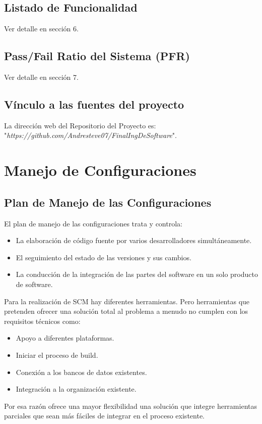 \documentclass[10pt]{article} %
\begin{document}
\subsection{Listado de Funcionalidad}
Ver detalle en sección 6. %

\subsection{Pass/Fail Ratio del Sistema (PFR)}
Ver detalle en sección 7.%

\subsection{Vínculo a las fuentes del proyecto}
La dirección web del Repositorio del Proyecto es: "\textit{https://github.com/Andresteve07/FinalIngDeSoftware}".

\section{Manejo de Configuraciones}

\subsection{Plan de Manejo de las Configuraciones}
El plan de manejo de las configuraciones trata y controla:
\begin{itemize}
\item La elaboración de código fuente por varios desarrolladores simultáneamente.
\item El seguimiento del estado de las versiones y sus cambios.
\item La conducción de la integración de las partes del software en un solo producto de software.
\end{itemize}
Para la realización de SCM hay diferentes herramientas. Pero herramientas que pretenden ofrecer una solución total al problema a menudo no cumplen con los requisitos técnicos como:
\begin{itemize}
\item Apoyo a diferentes plataformas.
\item Iniciar el proceso de build.
\item Conexión a los bancos de datos existentes.
\item Integración a la organización existente.
\end{itemize}
Por esa razón ofrece una mayor flexibilidad una solución que integre herramientas parciales que sean más fáciles de integrar en el proceso existente.
\end{document}

